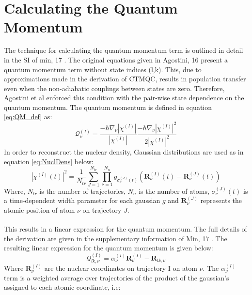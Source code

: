  \section{Calculating the Quantum Momentum \label{sec:calc_QM}}
 \label{sect:QM_Calc}
 The technique for calculating the quantum momentum term is outlined in detail in the SI of min, 17 \cite{min_ab_2017}. The original equations given in Agostini, 16\cite{agostini_quantum-classical_2016} present a quantum momentum term without state indices (l,k). This, due to approximations made in the derivation of CTMQC, results in population transfer even when the non-adiabatic couplings between states are zero. Therefore, Agostini et al enforced this condition with the pair-wise state dependence on the quantum momentum. The quantum momentum is defined in equation \eqref{eq:QM_def} as:
\begin{equation}
  \mathcal{Q}_{\nu}^{(I)} = \frac{-\hbar \nabla_{\nu} |\chi^{(I)}|}{|\chi^{(I)}|} \frac{-\hbar \nabla_{\nu}                            |\chi^{(I)}|^2}{2|\chi^{(I)}|^2}
  \label{eq:QM_def}
\end{equation}
In order to reconstruct the nuclear density, Gaussian distributions are used as in equation \eqref{eq:NuclDens} below:
\begin{equation}
	|\chi^{(I)}(t)|^2 = \frac{1}{N_{tr}} \sum_{J=1}^{N_{tr}} \prod_{\nu=1}^{N_n} g_{\sigma_{\nu}^{(J)}(t)} \left(\mathbf{R}_{\nu}^{(I)}(t) - \mathbf{R}_{\nu}^{(J)}(t)\right)
	\label{eq:NuclDens}
\end{equation}
Where, $N_{tr}$ is the number of trajectories, $N_{n}$ is the number of atoms, $\sigma_{\nu}^{(J)}(t)$ is a time-dependent width parameter for each gaussian $g$ and $\mathbf{R}_{\nu}^{(J)}$ represents the atomic position of atom $\nu$ on trajectory $J$.
\\\\
This results in a linear expression for the quantum momentum.
The full details of the derivation are given in the supplementary information of Min, 17 \cite{min_ab_2017}. The resulting linear expression for the quantum momentum is given below:
\begin{equation}
  \mathcal{Q}_{lk, \nu}^{(I)} = \alpha_{\nu}^{(I)} \mathbf{R}_{\nu}^{(I)} - \mathbf{R}_{lk, \nu}
  \label{eq:QM_lin}
\end{equation}
Where $\mathbf{R}_{\nu}^{(I)}$ are the nuclear coordinates on trajectory I on atom $\nu$. The $\alpha_{\nu}^{(I)}$ term is a weighted  average over trajectories of the product of the gaussian's assigned to each atomic coordinate, i.e:
